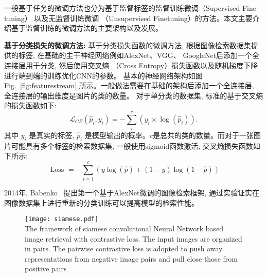 一般基于任务的微调方法也分为基于监督标签的监督训练微调（Supervised Fine-tuning） 以及无监督训练微调 （Unsupervised Finetuning）的方法。本文主要介绍基于监督训练的微调方法的主要架构以及发展。\par
\textbf{基于分类损失的微调方法:} 基于分类损失函数的微调方法, 根据图像检索数据集提供的标签, 在基础的主干神经网络例如AlexNet、VGG、 GoogleNet后添加一个全连接层用于分类, 然后使用交叉熵 （Cross Entropy）损失函数以及随机梯度下降进行端到端的训练优化CNN的参数。 基本的神经网络架构如图Fig.~\ref{fig:featurestream} 所示。一般做法需要在基础的架构后添加一个全连接层, 全连接层的输出维度是图片的类的数量。 对于单分类的数据集, 标准的基于交叉熵的损失函数如下:
\begin{equation}
    \mathcal{L}_{C E}\left(\hat{p}_i, y_i\right)=-\sum_i^c\left(y_i \times \log \left(\hat{p}_i\right)\right).
\end{equation}
其中 $y_i$ 是真实的标签, $\hat{p}_i$ 是模型输出的概率。$c$是总共的类的数量。而对于一张图片可能具有多个标签的检索数据集, 一般使用sigmoid函数激活, 交叉熵损失函数如下所示:
\begin{equation}
    \text { Loss }=-\sum_{i=1}^c(y \log (\hat{p})+(1-y) \log (1-\hat{p}))
    \label{eq:ce}
\end{equation} \par
2014年, Babenko~\cite{babenko2014neural} 提出第一个基于AlexNet微调的图像检索框架, 通过实验证实在图像数据集上进行重新的分类训练可以提高模型的检索性能。 \par

\begin{figure}[!htp]
    \centering
    \texttt{[image: siamese.pdf]} \\
      {The framework of siamese convolutional Neural Network based image retrieval with contrastive loss. The input images are organized in pairs. The pairwise contrastive loss is adopted to push away representations from negative image pairs and pull close those from positive pairs }
   \label{fig:siamese}
\end{figure}

